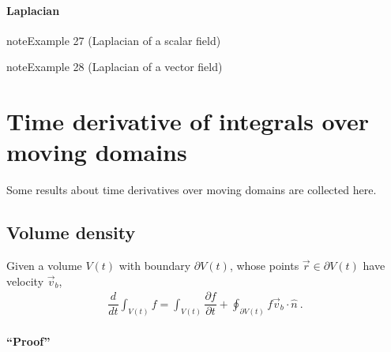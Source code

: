 \documentclass[letterpaper,10pt,english]{jupyterBook}
\begin{document}
\subsubsection{Laplacian}
\label{\detokenize{ch/tensor-algebra-calculus/calculus-euclidean-spherical:laplacian}}\label{\detokenize{ch/tensor-algebra-calculus/calculus-euclidean-spherical:tensor-calculus-spherical-differential-operators-laplacian}}\label{ch/tensor-algebra-calculus/calculus-euclidean-spherical:example-5}
\begin{sphinxadmonition}{note}{Example 27 (Laplacian of a scalar field)}


\end{sphinxadmonition}
\label{ch/tensor-algebra-calculus/calculus-euclidean-spherical:example-6}
\begin{sphinxadmonition}{note}{Example 28 (Laplacian of a vector field)}


\end{sphinxadmonition}

\sphinxstepscope


\chapter{Time derivative of integrals over moving domains}
\label{\detokenize{ch/tensor-algebra-calculus/time-derivative-of-integrals:time-derivative-of-integrals-over-moving-domains}}\label{\detokenize{ch/tensor-algebra-calculus/time-derivative-of-integrals:tensor-calculus-time-derivative-of-integrals}}\label{\detokenize{ch/tensor-algebra-calculus/time-derivative-of-integrals::doc}}
\sphinxAtStartPar
Some results about time derivatives over moving domains are collected here.


\section{Volume density}
\label{\detokenize{ch/tensor-algebra-calculus/time-derivative-of-integrals:volume-density}}\label{\detokenize{ch/tensor-algebra-calculus/time-derivative-of-integrals:tensor-calculus-time-derivative-of-integrals-volume-density}}
\sphinxAtStartPar
{}
Given a volume \(V(t)\) with boundary \(\partial V(t)\), whose points \(\vec{r} \in \partial V(t)\) have velocity \(\vec{v}_b\),
\begin{equation*}
\begin{split}\dfrac{d}{dt} \int_{V(t)} f = \int_{V(t)} \dfrac{\partial f}{\partial t} + \oint_{\partial V(t)} f \vec{v}_b \cdot \hat{n} \ .\end{split}
\end{equation*}\subsubsection*{“Proof”}
\end{document}

